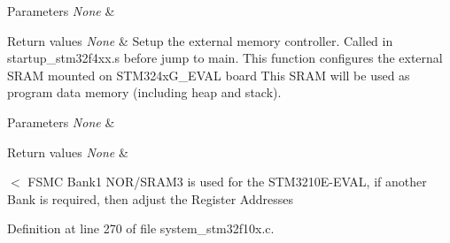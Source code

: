 \begin{DoxyParams}{Parameters}
{\em None} & \\
\hline
\end{DoxyParams}

\begin{DoxyRetVals}{Return values}
{\em None} & Setup the external memory controller. Called in startup\-\_\-stm32f4xx.\-s before jump to main. This function configures the external S\-R\-A\-M mounted on S\-T\-M324x\-G\-\_\-\-E\-V\-A\-L board This S\-R\-A\-M will be used as program data memory (including heap and stack). \\
\hline
\end{DoxyRetVals}

\begin{DoxyParams}{Parameters}
{\em None} & \\
\hline
\end{DoxyParams}

\begin{DoxyRetVals}{Return values}
{\em None} & \\
\hline
\end{DoxyRetVals}
$<$ F\-S\-M\-C Bank1 N\-O\-R/\-S\-R\-A\-M3 is used for the S\-T\-M3210\-E-\/\-E\-V\-A\-L, if another Bank is required, then adjust the Register Addresses 

Definition at line 270 of file system\-\_\-stm32f10x.\-c.

